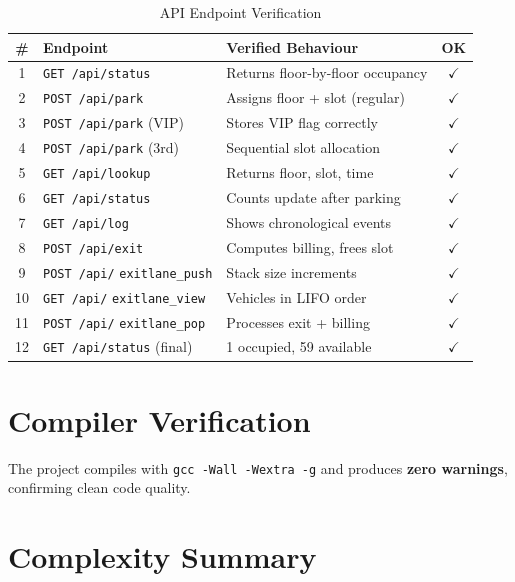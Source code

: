 \documentclass[12pt, a4paper]{report}
\begin{document}
\begin{table}[H]
\centering
\caption{API Endpoint Verification}
\label{tab:api}
{\footnotesize
\begin{tabularx}{\textwidth}{c p{4.2cm} X c}
\toprule
\textbf{\#} & \textbf{Endpoint} & \textbf{Verified Behaviour} & \textbf{OK} \\
\midrule
1  & \texttt{GET /api/status}    & Returns floor-by-floor occupancy & $\checkmark$ \\
2  & \texttt{POST /api/park}     & Assigns floor + slot (regular)   & $\checkmark$ \\
3  & \texttt{POST /api/park} (VIP)& Stores VIP flag correctly       & $\checkmark$ \\
4  & \texttt{POST /api/park} (3rd)& Sequential slot allocation      & $\checkmark$ \\
5  & \texttt{GET /api/lookup}    & Returns floor, slot, time        & $\checkmark$ \\
6  & \texttt{GET /api/status}    & Counts update after parking      & $\checkmark$ \\
7  & \texttt{GET /api/log}       & Shows chronological events       & $\checkmark$ \\
8  & \texttt{POST /api/exit}     & Computes billing, frees slot     & $\checkmark$ \\
9  & \texttt{POST /api/} \newline \texttt{exitlane\_push}  & Stack size increments  & $\checkmark$ \\
10 & \texttt{GET /api/} \newline \texttt{exitlane\_view}   & Vehicles in LIFO order & $\checkmark$ \\
11 & \texttt{POST /api/} \newline \texttt{exitlane\_pop}   & Processes exit + billing& $\checkmark$ \\
12 & \texttt{GET /api/status} (final) & 1 occupied, 59 available   & $\checkmark$ \\
\bottomrule
\end{tabularx}
}
\end{table}

\section{Compiler Verification}

The project compiles with \texttt{gcc -Wall -Wextra -g} and produces
\textbf{zero warnings}, confirming clean code quality.

\section{Complexity Summary}
\end{document}
